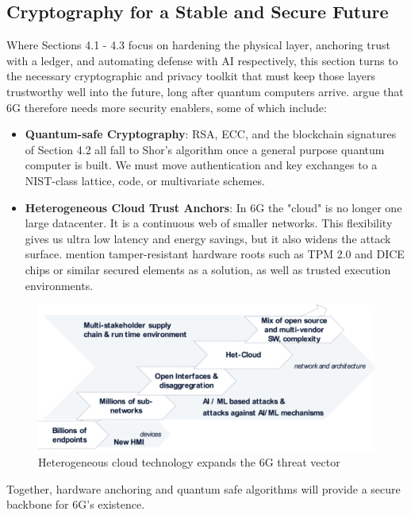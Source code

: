 \documentclass[acmtog]{acmart}
\begin{document}
\subsection{Cryptography for a Stable and Secure Future}
Where Sections 4.1 - 4.3 focus on hardening the physical layer, anchoring trust with a ledger, and automating defense with AI respectively, this section turns to the necessary cryptographic and privacy toolkit that must keep those layers trustworthy well into the future, long after quantum computers arrive. \cite{ref8} argue that 6G therefore needs more security enablers, some of which include:
\begin{itemize}
  \item \textbf{Quantum-safe Cryptography}: RSA, ECC, and the blockchain signatures of Section 4.2 all fall to Shor's algorithm once a general purpose quantum computer is built. We must move authentication and key exchanges to a NIST-class lattice, code, or multivariate schemes. 
  \item \textbf{Heterogeneous Cloud Trust Anchors}: In 6G the "cloud" is no longer one large datacenter. It is a continuous web of smaller networks. This flexibility gives us ultra low latency and energy savings, but it also widens the attack surface. \cite{ref8} mention tamper-resistant hardware roots such as TPM 2.0 and DICE chips or similar secured elements as a solution, as well as trusted execution environments.
\end{itemize}
\begin{figure}[h]
  \centering
  \includegraphics[width=\linewidth]{4.4.png}
  \caption{Heterogeneous cloud technology expands the 6G threat vector \cite{ref8}}
\end{figure}
Together, hardware anchoring and quantum safe algorithms will provide a secure backbone for 6G's existence.
\end{document}
